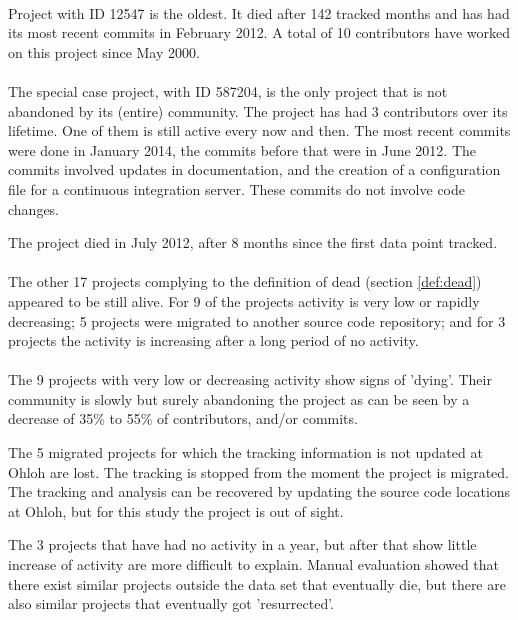 \paragraph{}
Project with ID 12547 is the oldest. It died after 142 tracked months and has
had its most recent commits in February 2012. A total of 10 contributors have
worked on this project since May 2000.

\paragraph{}
The special case project, with ID 587204, is the only project that is not
abandoned by its (entire) community. The project has had 3 contributors over its
lifetime. One of them is still active every now and then. The most recent
commits were done in January 2014, the commits before that were in June 2012.
The commits involved updates in documentation, and the creation of a
configuration file for a continuous integration server. These commits do not
involve code changes.

The project died in July 2012, after 8 months since the first data point
tracked.

\paragraph{}
The other 17 projects complying to the definition of dead (section
\ref{def:dead}) appeared to be still alive. For 9 of the projects activity is
very low or rapidly decreasing; 5 projects were migrated to another source code
repository; and for 3 projects the activity is increasing after a long period of
no activity.

\paragraph{}
The 9 projects with very low or decreasing activity show signs of 'dying'. Their
community is slowly but surely abandoning the project as can be seen by a
decrease of 35\% to 55\% of contributors, and/or commits.

The 5 migrated projects for which the tracking information is not updated at
Ohloh are lost. The tracking is stopped from the moment the project is
migrated. The tracking and analysis can be recovered by updating the source
code locations at Ohloh, but for this study the project is out of sight.

The 3 projects that have had no activity in a year, but after that show little
increase of activity are more difficult to explain. Manual evaluation showed
that there exist similar projects outside the data set that eventually die, but
there are also similar projects that eventually got 'resurrected'.



